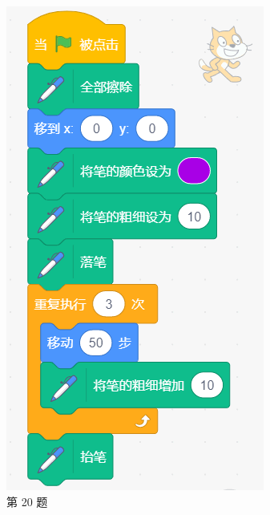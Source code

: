 \documentclass[10pt, a4paper]{article}
\begin{document}
\begin{enumerate}
\begin{figure}[htbp]
\begin{minipage}[t]{.15\textwidth}
                \includegraphics[width=\textwidth]{figure/20.png}
                \caption*{第 20 题}
            \end{minipage}
        \end{figure}


\end{enumerate}
\end{document}
